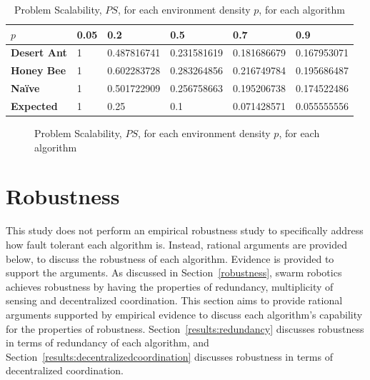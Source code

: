 \begin{table}[]
\centering
\caption{Problem Scalability, $PS$, for each environment density $p$, for each algorithm}
\label{table:problemscalability}
\begin{tabular}{@{}llllll@{}}
\toprule
\textbf{$p$}                  & \textbf{0.05} & \textbf{0.2        } & \textbf{0.5}         & \textbf{0.7}         & \textbf{0.9}         \\ \midrule
\textbf{Desert Ant}           & 1    & 0.487816741 & 0.231581619 & 0.181686679 & 0.167953071 \\
\textbf{Honey Bee}            & 1    & 0.602283728 & 0.283264856 & 0.216749784 & 0.195686487 \\
\textbf{Na\"ive}              & 1    & 0.501722909 & 0.256758663 & 0.195206738 & 0.174522486 \\
\textbf{Expected} & 1    & 0.25        & 0.1         & 0.071428571 & 0.055555556 \\ \bottomrule
\end{tabular}
\end{table}

\begin{figure}[!htb]
\centering
\resizebox{\textwidth}{!}{}
\caption{Problem Scalability, $PS$, for each environment density $p$, for each algorithm}
\label{fig:problemscalability}
\end{figure}

\section{Robustness}
\label{results:robustness}
This study does not perform an empirical robustness study to specifically address how fault tolerant each algorithm is. Instead, rational arguments are provided below, to discuss the robustness of each algorithm. Evidence is provided to support the arguments. As discussed in Section~\ref{robustness}, swarm robotics achieves robustness by having the properties of redundancy, multiplicity of sensing and decentralized coordination. This section aims to provide rational arguments supported by empirical evidence to discuss each  algorithm's capability for the properties of robustness. Section~\ref{results:redundancy} discusses robustness in terms of redundancy of each algorithm, and Section~\ref{results:decentralizedcoordination} discusses robustness in terms of decentralized coordination.

